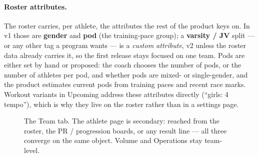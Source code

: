 \documentclass[11pt]{article}
\begin{document}
\paragraph{Roster attributes.} The roster carries, per athlete, the
attributes the rest of the product keys on. In v1 those are \textbf{gender}
and \textbf{pod} (the training-pace group); a \textbf{varsity / JV} split
--- or any other tag a program wants --- is a \emph{custom attribute}, v2
unless the roster data already carries it, so the first release stays
focused on one team. Pods are either set by hand or proposed: the coach
chooses the number of pods, or the number of athletes per pod, and whether
pods are mixed- or single-gender, and the product estimates current pods
from training paces and recent race marks. Workout variants in Upcoming
address these attributes directly (``girls: 4 tempo''), which is why they
live on the roster rather than in a settings page.

\begin{figure}[h]
\centering
{}
\caption{The Team tab. The athlete page is secondary: reached from the
roster, the PR / progression boards, or any result line --- all three
converge on the same object. Volume and Operations stay team-level.}
\label{fig:teamflow}
\end{figure}
\end{document}
